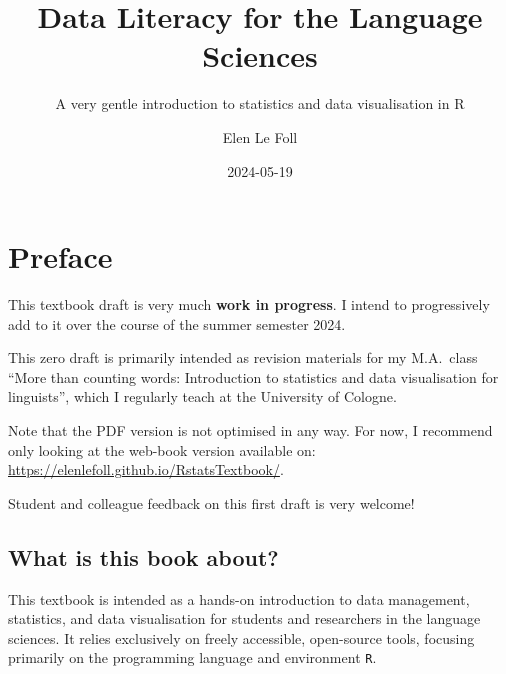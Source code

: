 \documentclass[
  letterpaper,
  DIV=11,
  numbers=noendperiod]{scrreprt}
\title{Data Literacy for the Language Sciences}
\subtitle{A very gentle introduction to statistics and data
visualisation in R}
\author{Elen Le Foll}
\date{2024-05-19}
\renewcommand*\contentsname{Table of contents}
\newcommand\contentsname{Table of contents}
\begin{document}
\maketitle

\renewcommand*\contentsname{Table of contents}
{
\hypersetup{linkcolor=}
\setcounter{tocdepth}{2}
\tableofcontents
}

\chapter*{Preface}\label{preface}


\begin{tcolorbox}[enhanced jigsaw, colframe=quarto-callout-warning-color-frame, titlerule=0mm, toptitle=1mm, leftrule=.75mm, colbacktitle=quarto-callout-warning-color!10!white, title=\textcolor{quarto-callout-warning-color}{\faExclamationTriangle}\hspace{0.5em}{Warning}, bottomtitle=1mm, coltitle=black, breakable, opacitybacktitle=0.6, colback=white, left=2mm, arc=.35mm, opacityback=0, toprule=.15mm, rightrule=.15mm, bottomrule=.15mm]

This textbook draft is very much \textbf{work in progress}. I intend to
progressively add to it over the course of the summer semester 2024.

This zero draft is primarily intended as revision materials for my
M.A.~class ``More than counting words: Introduction to statistics and
data visualisation for linguists'', which I regularly teach at the
University of Cologne.

Note that the PDF version is not optimised in any way. For now, I
recommend only looking at the web-book version available on:
\url{https://elenlefoll.github.io/RstatsTextbook/}.

Student and colleague feedback on this first draft is very welcome!

\end{tcolorbox}

\section*{What is this book about?}\label{what-is-this-book-about}


This textbook is intended as a hands-on introduction to data management,
statistics, and data visualisation for students and researchers in the
language sciences. It relies exclusively on freely accessible,
open-source tools, focusing primarily on the programming language and
environment \texttt{R}.
\end{document}
